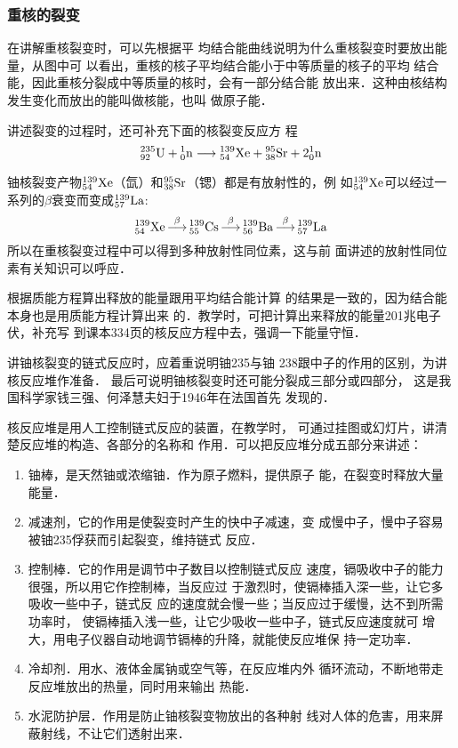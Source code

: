 \subsubsection{重核的裂变}

在讲解重核裂变时，可以先根据平
均结合能曲线说明为什么重核裂变时要放出能量，从图中可
以看出，重核的核子平均结合能小于中等质量的核子的平均
结合能，因此重核分裂成中等质量的核时，会有一部分结合能
放出来．这种由核结构发生变化而放出的能叫做核能，也叫
做原子能．

讲述裂变的过程时，还可补充下面的核裂变反应方
程
\[\atom{U}{235}{92}+\atom{n}{1}{0}\longrightarrow \atom{Xe}{139}{54}+\atom{Sr}{95}{38}+2\atom{n}{1}{0}\]

铀核裂变产物$\atom{Xe}{139}{54}$（氙）和$\atom{Sr}{95}{38}$（锶）都是有放射性的，例
如$\atom{Xe}{139}{54}$可以经过一系列的$\beta$衰变而变成$\atom{La}{139}{57}$:
\[\atom{Xe}{139}{54} \mathop{\longrightarrow}^{\beta}   \atom{Cs}{139}{55}  \mathop{\longrightarrow}^{\beta}    \atom{Ba}{139}{56}  \mathop{\longrightarrow}^{\beta}    \atom{La}{139}{57}\]
所以在重核裂变过程中可以得到多种放射性同位素，这与前
面讲述的放射性同位素有关知识可以呼应．

根据质能方程算出释放的能量跟用平均结合能计算
的结果是一致的，因为结合能本身也是用质能方程计算出来
的．教学时，可把计算出来释放的能量201兆电子伏，补充写
到课本334页的核反应方程中去，强调一下能量守恒．

讲铀核裂变的链式反应时，应着重说明铀235与铀
238跟中子的作用的区别，为讲核反应堆作准备．
最后可说明铀核裂变时还可能分裂成三部分或四部分，
这是我国科学家钱三强、何泽慧夫妇于1946年在法国首先
发现的．

核反应堆是用人工控制链式反应的装置，在教学时，
可通过挂图或幻灯片，讲清楚反应堆的构造、各部分的名称和
作用．可以把反应堆分成五部分来讲述：
\begin{enumerate}
\item 铀棒，是天然铀或浓缩铀．作为原子燃料，提供原子
能，在裂变时释放大量能量．
\item 减速剂，它的作用是使裂变时产生的快中子减速，变
成慢中子，慢中子容易被铀235俘获而引起裂变，维持链式
反应．
\item 控制棒．它的作用是调节中子数目以控制链式反应
速度，镉吸收中子的能力很强，所以用它作控制棒，当反应过
于激烈时，使镉棒插入深一些，让它多吸收一些中子，链式反
应的速度就会慢一些；当反应过于缓慢，达不到所需功率时，
使镉棒插入浅一些，让它少吸收一些中子，链式反应速度就可
增大，用电子仪器自动地调节镉棒的升降，就能使反应堆保
持一定功率．
\item 冷却剂．用水、液体金属钠或空气等，在反应堆内外
循环流动，不断地带走反应堆放出的热量，同时用来输出
热能．
\item 水泥防护层．作用是防止铀核裂变物放出的各种射
线对人体的危害，用来屏蔽射线，不让它们透射出来．
\end{enumerate}

